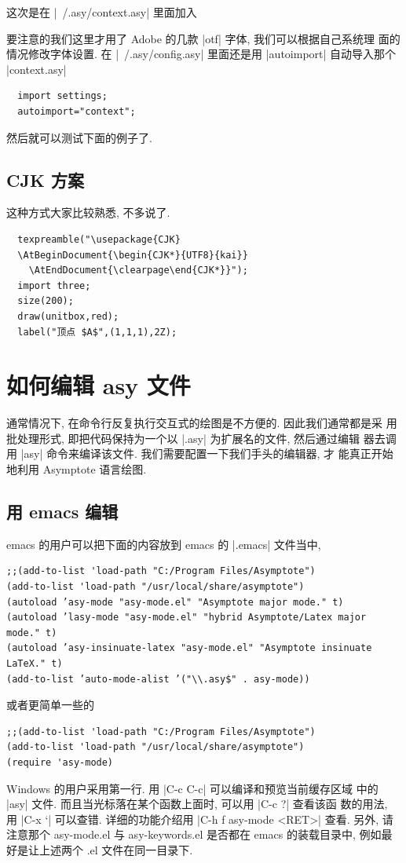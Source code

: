 \documentclass{ctexbook}
\begin{document}
这次是在 |~/.asy/context.asy| 里面加入

要注意的我们这里才用了 Adobe 的几款 |otf| 字体, 我们可以根据自己系统理
面的情况修改字体设置.
在 |~/.asy/config.asy| 里面还是用 |autoimport| 自动导入那个
|context.asy|
\begin{lstlisting}
  import settings;
  autoimport="context";
\end{lstlisting}
然后就可以测试下面的例子了.


\subsection{CJK 方案}
这种方式大家比较熟悉, 不多说了.
\begin{lstlisting}
  texpreamble("\usepackage{CJK}
  \AtBeginDocument{\begin{CJK*}{UTF8}{kai}}
    \AtEndDocument{\clearpage\end{CJK*}}");
  import three;
  size(200);
  draw(unitbox,red);
  label("顶点 $A$",(1,1,1),2Z);
\end{lstlisting}

\section{如何编辑 asy 文件}
通常情况下, 在命令行反复执行交互式的绘图是不方便的. 因此我们通常都是采
用批处理形式, 即把代码保持为一个以 |.asy| 为扩展名的文件, 然后通过编辑
器去调用 |asy| 命令来编译该文件. 我们需要配置一下我们手头的编辑器, 才
能真正开始地利用 Asymptote 语言绘图.\label{asy:Editors}

\subsection{用 emacs 编辑}
emacs 的用户可以把下面的内容放到 emacs 的 |.emacs| 文件当中,
\begin{verbatim}
;;(add-to-list 'load-path "C:/Program Files/Asymptote")
(add-to-list 'load-path "/usr/local/share/asymptote")
(autoload ’asy-mode "asy-mode.el" "Asymptote major mode." t)
(autoload ’lasy-mode "asy-mode.el" "hybrid Asymptote/Latex major mode." t)
(autoload ’asy-insinuate-latex "asy-mode.el" "Asymptote insinuate LaTeX." t)
(add-to-list ’auto-mode-alist ’("\\.asy$" . asy-mode))
\end{verbatim}
或者更简单一些的
\begin{verbatim}
;;(add-to-list 'load-path "C:/Program Files/Asymptote")
(add-to-list 'load-path "/usr/local/share/asymptote")
(require 'asy-mode)
\end{verbatim}
Windows 的用户采用第一行. 用 |C-c C-c| 可以编译和预览当前缓存区域
中的 |asy| 文件. 而且当光标落在某个函数上面时, 可以用 |C-c ?| 查看该函
数的用法, 用 |C-x `| 可以查错. 详细的功能介绍用 |C-h f asy-mode <RET>|
查看. 另外, 请注意那个 asy-mode.el 与 asy-keywords.el 是否都在 emacs
的装载目录中, 例如最好是让上述两个 .el 文件在同一目录下.
\end{document}
